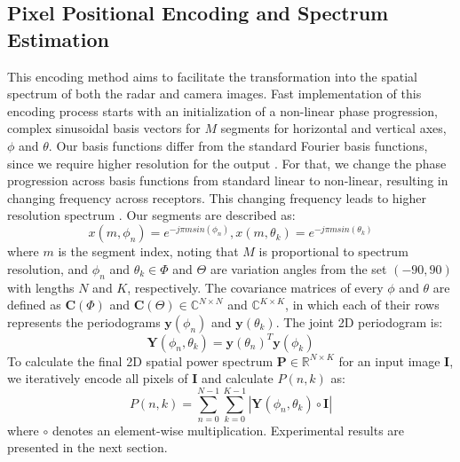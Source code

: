 \subsection{Pixel Positional Encoding and Spectrum Estimation}
This encoding method aims to facilitate the transformation into the spatial spectrum of both the radar and camera images. Fast implementation of this encoding process starts with an initialization of a non-linear phase progression, complex sinusoidal basis vectors for $M$ segments for horizontal and vertical axes, $\phi$ and $\theta$. Our basis functions differ from the standard Fourier basis functions, since we require higher resolution for the output \cite{priestley1981spectral}. For that, we change the phase progression across basis functions from standard linear to non-linear, resulting in changing frequency across receptors. This changing frequency leads to higher resolution spectrum \cite{richards2010principles}. Our segments are described as:
\begin{equation}
    x(m,\phi_n)=e^{-j\pi m sin(\phi_n)} , x(m,\theta_k)=e^{-j\pi m sin(\theta_k)}
    \label{eq:horizontal_basis}
\end{equation}
where $m$ is the segment index, noting that $M$ is proportional to spectrum resolution, and $\phi_n$ and $\theta_k \in \Phi$ and $\Theta$ are variation angles from the set $(-90, 90)$ with lengths $N$ and $K$, respectively. The covariance matrices of every $\phi$ and $\theta$ are defined as $\textbf{C}(\Phi)$ and $\textbf{C}(\Theta) \in \mathbb{C}^{N \times N}$ and $\mathbb{C}^{K \times K}$, in which each of their rows represents the periodograms $\textbf{y}(\phi_n)$ and $\textbf{y}(\theta_k)$. The joint 2D periodogram is:
\begin{equation}
    \textbf{Y}(\phi_n, \theta_k) = \textbf{y}(\theta_n)^T\textbf{y}(\phi_k)
\end{equation}
To calculate the final 2D spatial power spectrum $\textbf{P} \in \mathbb{R}^{N \times K}$ for an input image $\textbf{I}$, we iteratively encode all pixels of $\textbf{I}$ and calculate $P(n,k)$ as:
\begin{equation}
    P(n,k)= \sum_{n=0}^{N-1} \sum_{k=0}^{K-1} \left| \textbf{Y}(\phi_n, \theta_k) \circ \textbf{I}\right|
\end{equation}
where $\circ$ denotes an element-wise multiplication. Experimental results are presented in the next section.

